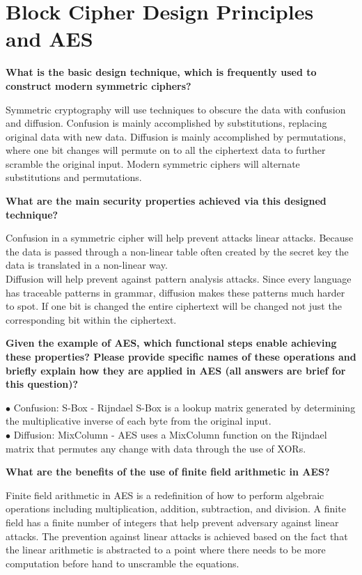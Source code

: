 \documentclass[letterpaper,11pt,notitlepage,fleqn]{article}
\begin{document}
\section{Block Cipher Design Principles and AES}
\noindent \textbf{What is the basic design  technique,  which  is  frequently  used  to  construct  modern symmetric ciphers?}

Symmetric cryptography will use techniques to obscure the data with confusion and diffusion. Confusion is mainly accomplished by substitutions, replacing original data with new data. Diffusion is mainly accomplished by permutations, where one bit changes will permute on to all the ciphertext data to further scramble the original input. Modern symmetric ciphers will alternate substitutions and permutations.

\noindent \textbf{What are the main security properties achieved via this designed technique?}

Confusion in a symmetric cipher will help prevent attacks linear attacks. Because the data is passed through a non-linear table often created by the secret key the data is translated in a non-linear way.\\
\indent Diffusion will help prevent against pattern analysis attacks. Since every language has traceable patterns in grammar, diffusion makes these patterns much harder to spot. If one bit is changed the entire ciphertext will be changed not just the corresponding bit within the ciphertext. 

\noindent \textbf{Given the  example  of  AES,  which  functional  steps  enable achieving  these  properties?  Please provide  specific  names  of  these operations  and  briefly  explain  how  they  are  applied  in AES (all answers are brief for this question)?}

\noindent$\bullet$ Confusion: S-Box - Rijndael S-Box is a lookup matrix generated by determining the multiplicative inverse of each byte from the original input. \\
$\bullet$ Diffusion: MixColumn - AES uses a MixColumn function on the Rijndael matrix that permutes any change with data through the use of XORs. 

\noindent \textbf{What are the benefits of the use of finite field arithmetic in AES?}

Finite field arithmetic in AES is a redefinition of how to perform algebraic operations including multiplication, addition, subtraction, and division. A finite field has a finite number of integers that  help prevent adversary against linear attacks. The prevention against linear attacks is achieved based on the fact that the linear arithmetic is abstracted to a point where there needs to be more computation before hand to unscramble the equations.  
\end{document}
